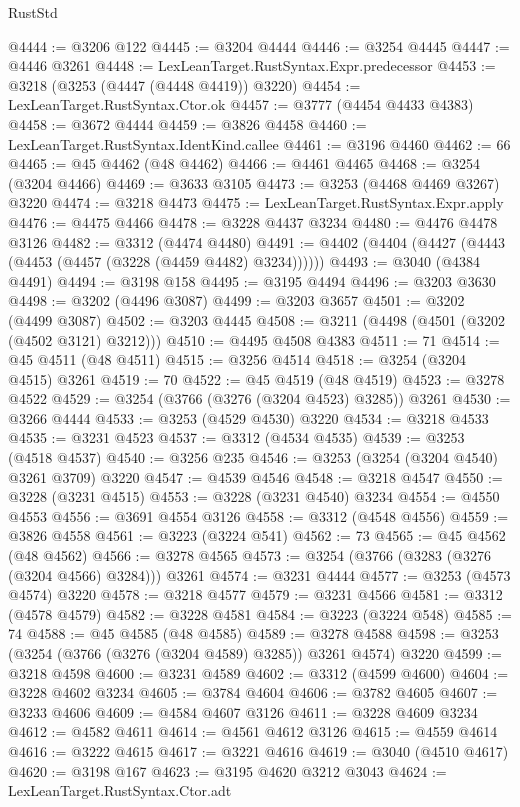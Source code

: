 \begin{lexlean}{RustStd}
\begin{coremodule}
@4444 := @3206 @122
@4445 := @3204 @4444
@4446 := @3254 @4445
@4447 := @4446 @3261
@4448 := LexLeanTarget.RustSyntax.Expr.predecessor
@4453 := @3218 (@3253 (@4447 (@4448 @4419)) @3220)
@4454 := LexLeanTarget.RustSyntax.Ctor.ok
@4457 := @3777 (@4454 @4433 @4383)
@4458 := @3672 @4444
@4459 := @3826 @4458
@4460 := LexLeanTarget.RustSyntax.IdentKind.callee
@4461 := @3196 @4460
@4462 := 66
@4465 := @45 @4462 (@48 @4462)
@4466 := @4461 @4465
@4468 := @3254 (@3204 @4466)
@4469 := @3633 @3105
@4473 := @3253 (@4468 @4469 @3267) @3220
@4474 := @3218 @4473
@4475 := LexLeanTarget.RustSyntax.Expr.apply
@4476 := @4475 @4466
@4478 := @3228 @4437 @3234
@4480 := @4476 @4478 @3126
@4482 := @3312 (@4474 @4480)
@4491 := @4402 (@4404 (@4427 (@4443 (@4453 (@4457 (@3228 (@4459 @4482) @3234))))))
@4493 := @3040 (@4384 @4491)
@4494 := @3198 @158
@4495 := @3195 @4494
@4496 := @3203 @3630
@4498 := @3202 (@4496 @3087)
@4499 := @3203 @3657
@4501 := @3202 (@4499 @3087)
@4502 := @3203 @4445
@4508 := @3211 (@4498 (@4501 (@3202 (@4502 @3121) @3212)))
@4510 := @4495 @4508 @4383
@4511 := 71
@4514 := @45 @4511 (@48 @4511)
@4515 := @3256 @4514
@4518 := @3254 (@3204 @4515) @3261
@4519 := 70
@4522 := @45 @4519 (@48 @4519)
@4523 := @3278 @4522
@4529 := @3254 (@3766 (@3276 (@3204 @4523) @3285)) @3261
@4530 := @3266 @4444
@4533 := @3253 (@4529 @4530) @3220
@4534 := @3218 @4533
@4535 := @3231 @4523
@4537 := @3312 (@4534 @4535)
@4539 := @3253 (@4518 @4537)
@4540 := @3256 @235
@4546 := @3253 (@3254 (@3204 @4540) @3261 @3709) @3220
@4547 := @4539 @4546
@4548 := @3218 @4547
@4550 := @3228 (@3231 @4515)
@4553 := @3228 (@3231 @4540) @3234
@4554 := @4550 @4553
@4556 := @3691 @4554 @3126
@4558 := @3312 (@4548 @4556)
@4559 := @3826 @4558
@4561 := @3223 (@3224 @541)
@4562 := 73
@4565 := @45 @4562 (@48 @4562)
@4566 := @3278 @4565
@4573 := @3254 (@3766 (@3283 (@3276 (@3204 @4566) @3284))) @3261
@4574 := @3231 @4444
@4577 := @3253 (@4573 @4574) @3220
@4578 := @3218 @4577
@4579 := @3231 @4566
@4581 := @3312 (@4578 @4579)
@4582 := @3228 @4581
@4584 := @3223 (@3224 @548)
@4585 := 74
@4588 := @45 @4585 (@48 @4585)
@4589 := @3278 @4588
@4598 := @3253 (@3254 (@3766 (@3276 (@3204 @4589) @3285)) @3261 @4574) @3220
@4599 := @3218 @4598
@4600 := @3231 @4589
@4602 := @3312 (@4599 @4600)
@4604 := @3228 @4602 @3234
@4605 := @3784 @4604
@4606 := @3782 @4605
@4607 := @3233 @4606
@4609 := @4584 @4607 @3126
@4611 := @3228 @4609 @3234
@4612 := @4582 @4611
@4614 := @4561 @4612 @3126
@4615 := @4559 @4614
@4616 := @3222 @4615
@4617 := @3221 @4616
@4619 := @3040 (@4510 @4617)
@4620 := @3198 @167
@4623 := @3195 @4620 @3212 @3043
@4624 := LexLeanTarget.RustSyntax.Ctor.adt

\end{coremodule}
\end{lexlean}
